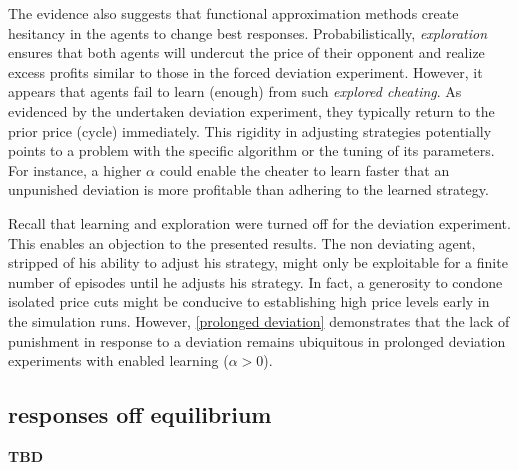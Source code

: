 The evidence also suggests that functional approximation methods create hesitancy in the agents to change best responses. Probabilistically, \emph{exploration} ensures that both agents will undercut the price of their opponent and realize excess profits similar to those in the forced deviation experiment. However, it appears that agents fail to learn (enough) from such \emph{explored cheating}. As evidenced by the undertaken deviation experiment, they typically return to the prior price (cycle) immediately. This rigidity in adjusting strategies potentially points to a problem with the specific algorithm or the tuning of its parameters. For instance, a higher $\alpha$ could enable the cheater to learn faster that an unpunished deviation is more profitable than adhering to the learned strategy. 

Recall that learning and exploration were turned off for the deviation experiment. This enables an objection to the presented results. The non deviating agent, stripped of his ability to adjust his strategy, might only be exploitable for a finite number of episodes until he adjusts his strategy. In fact, a generosity to condone isolated price cuts might be conducive to establishing high price levels early in the simulation runs. However, \autoref{prolonged deviation} demonstrates that the lack of punishment in response to a deviation remains ubiquitous in prolonged deviation experiments with enabled learning ($\alpha > 0$).

\subsection{responses off equilibrium}

\textbf{TBD}



